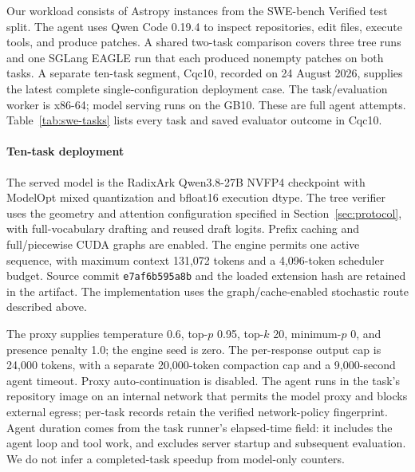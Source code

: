 Our workload consists of Astropy instances from the SWE-bench Verified test split. The agent uses Qwen Code 0.19.4 to inspect repositories, edit files, execute tools, and produce patches. A shared two-task comparison covers three tree runs and one SGLang EAGLE run that each produced nonempty patches on both tasks. A separate ten-task segment, Cqc10, recorded on 24 August 2026, supplies the latest complete single-configuration deployment case. The task/evaluation worker is x86-64; model serving runs on the GB10. These are full agent attempts. Table~\ref{tab:swe-tasks} lists every task and saved evaluator outcome in Cqc10.

\paragraph{Ten-task deployment}
The served model is the RadixArk Qwen3.8-27B NVFP4 checkpoint with ModelOpt mixed quantization and bfloat16 execution dtype. The tree verifier uses the geometry and attention configuration specified in Section~\ref{sec:protocol}, with full-vocabulary drafting and reused draft logits. Prefix caching and full/piecewise CUDA graphs are enabled. The engine permits one active sequence, with maximum context 131,072 tokens and a 4,096-token scheduler budget. Source commit \texttt{e7af6b595a8b} and the loaded extension hash are retained in the artifact. The implementation uses the graph/cache-enabled stochastic route described above.

The proxy supplies temperature 0.6, top-$p$ 0.95, top-$k$ 20, minimum-$p$ 0, and presence penalty 1.0; the engine seed is zero. The per-response output cap is 24,000 tokens, with a separate 20,000-token compaction cap and a 9,000-second agent timeout. Proxy auto-continuation is disabled. The agent runs in the task's repository image on an internal network that permits the model proxy and blocks external egress; per-task records retain the verified network-policy fingerprint. Agent duration comes from the task runner's elapsed-time field: it includes the agent loop and tool work, and excludes server startup and subsequent evaluation. We do not infer a completed-task speedup from model-only counters.

